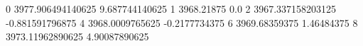 0 3977.906494140625 9.687744140625
1 3968.21875 0.0
2 3967.337158203125 -0.881591796875
4 3968.0009765625 -0.2177734375
6 3969.68359375 1.46484375
8 3973.11962890625 4.90087890625

